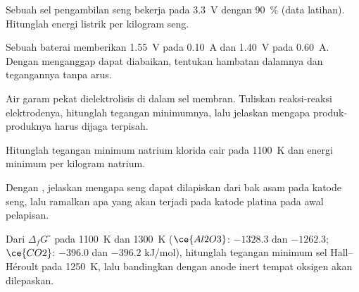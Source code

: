 \begin{exercise}[$\star\star$]\label{exo:b2:batteries-electrolysis:6}
Sebuah sel  pengambilan seng bekerja pada \qty{3.3}{V} dengan
 90~\% (data latihan). Hitunglah energi listrik per
kilogram seng.
\end{exercise}

\begin{exercise}[$\star\star$]\label{exo:b2:batteries-electrolysis:7}
Sebuah baterai memberikan \qty{1.55}{V} pada \qty{0.10}{A} dan
\qty{1.40}{V} pada \qty{0.60}{A}. Dengan menganggap  dapat
diabaikan, tentukan hambatan dalamnya dan tegangannya tanpa arus.
\end{exercise}

\begin{exercise}[$\star\star$]\label{exo:b2:batteries-electrolysis:8}
Air garam pekat dielektrolisis di dalam sel membran. Tuliskan reaksi-reaksi
elektrodenya, hitunglah tegangan minimumnya, lalu jelaskan mengapa
produk-produknya harus dijaga terpisah.
\end{exercise}

\begin{exercise}[$\star\star$]\label{exo:b2:batteries-electrolysis:9}
Hitunglah tegangan minimum  natrium klorida cair pada
\qty{1100}{K} dan energi minimum per kilogram natrium.
\end{exercise}

\begin{exercise}[$\star\star\star$]\label{exo:b2:batteries-electrolysis:10}
Dengan , jelaskan mengapa seng dapat dilapiskan dari
bak asam pada katode seng, lalu ramalkan apa yang akan terjadi pada katode
platina pada awal pelapisan.
\end{exercise}

\begin{exercise}[$\star\star\star$]\label{exo:b2:batteries-electrolysis:11}
Dari $\Delta_f G^\circ$ pada \qty{1100}{K} dan \qty{1300}{K} ($\ce{Al2O3}$:
$-1328.3$ dan $-1262.3$; $\ce{CO2}$: $-396.0$ dan $-396.2$ \unit{kJ/mol}),
hitunglah tegangan minimum sel Hall--Héroult pada \qty{1250}{K}, lalu
bandingkan dengan anode inert tempat oksigen akan dilepaskan.
\end{exercise}

